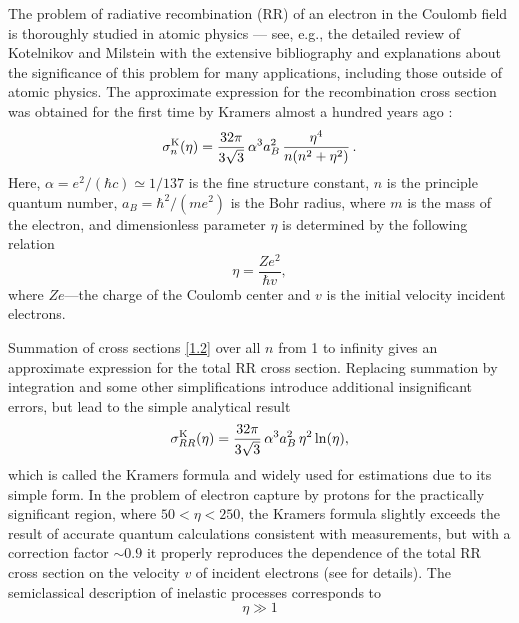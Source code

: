 \documentclass{SovJurn/JETPL}
\begin{document}
The problem of radiative recombination (RR) of an electron in the Coulomb field is thoroughly studied in atomic physics --- see, e.g., the detailed review of Kotelnikov and Milstein \cite{kotelnikov2019electron} with the extensive bibliography and explanations about the significance of this problem for many applications, including those outside of atomic physics. The approximate expression for the recombination cross section was obtained for the first time by Kramers almost a hundred years ago \cite{kramers1923xciii}:
\begin{equation}
\label{1.2}
\sigma^{\rm K}_{n}(\eta)=\frac{32\pi}{3\sqrt{3}}\,\alpha^3a_B^2\,\frac{\eta^4}{n(n^2+\eta^2)}\,.
\end{equation}
Here, $\alpha=e^2/(\hbar c)\simeq 1/137$ is the fine structure constant, $n$ is the principle quantum number, $a_B=\hbar^2/(me^2)$ is the Bohr radius, where $m$ is the mass of the electron, and dimensionless parameter $\eta$ is determined by the following relation
\begin{equation}
\eta=\frac{Ze^2}{\hbar v},
\label{eta}
\end{equation}
\newline
where $Ze$---the charge of the Coulomb center and $v$ is the initial velocity incident electrons. 
\par Summation of cross sections \eqref{1.2} over all $n$ from 1 to infinity gives an approximate expression for the total RR cross section. Replacing summation by integration and some other simplifications introduce additional insignificant errors, but lead to the simple analytical result
\begin{equation}
\label{1.5}
\sigma^{\rm K}_{RR}(\eta)=\frac{32\pi}{3\sqrt{3}}\,\alpha^3a_B^2\,\eta^2\ln (\eta),
\end{equation}
which is called the Kramers formula and widely used for estimations due to its simple form. In the problem of electron capture by protons for the practically significant region, where $50 <\eta <250$, the Kramers formula slightly exceeds the result of accurate quantum calculations consistent with measurements, but with a correction factor $\sim 0.9$ it properly reproduces the dependence of the total RR cross section on the velocity $v$ of incident electrons (see \cite{kotelnikov2019electron} for details). The semiclassical description of inelastic processes corresponds to
\begin{equation}
\eta\gg 1
\label{low_speed_relation}
\end{equation}
\end{document}
